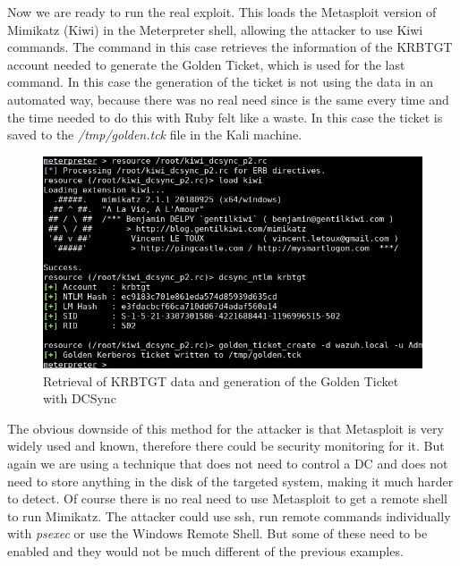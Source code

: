 Now we are ready to run the real exploit. This loads the Metasploit version of Mimikatz (Kiwi) in the Meterpreter shell, allowing the attacker to use Kiwi commands. The command in this case retrieves the information of the KRBTGT account needed to generate the Golden Ticket, which is used for the last command. In this case the generation of the ticket is not using the data in an automated way, because there was no real need since is the same every time and the time needed to do this with Ruby felt like a waste. In this case the ticket is saved to the \textit{/tmp/golden.tck} file in the Kali machine.
\linej

\begin{figure}[H]
	\centering
	\includegraphics[width=\textwidth]{figuras/kiwi_p2.png}
	\caption{Retrieval of KRBTGT data and generation of the Golden Ticket with DCSync}
\end{figure}
The obvious downside of this method for the attacker is that Metasploit is very widely used and known, therefore there could be security monitoring for it\cite{detect_metasploit_traffic}. But again we are using a technique that does not need to control a DC and does not need to store anything in the disk of the targeted system, making it much harder to detect.
\linej
\linej
Of course there is no real need to use Metasploit to get a remote shell to run Mimikatz. The attacker could use ssh, run remote commands individually with \textit{psexec} or use the Windows Remote Shell. But some of these need to be enabled and they would not be much different of the previous examples.

